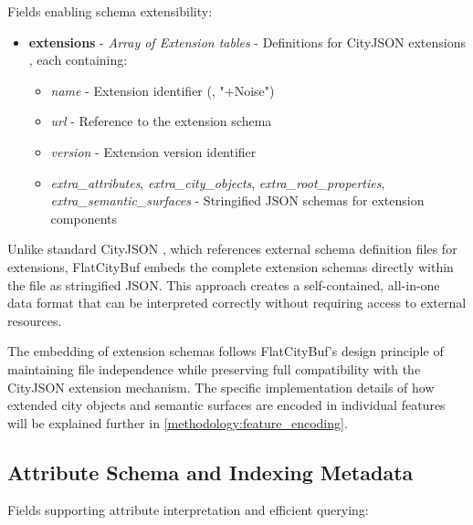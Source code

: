 Fields enabling schema extensibility:

\begin{itemize}
  \item \textbf{extensions} - \textit{Array of Extension tables} - Definitions for CityJSON extensions \citep{cityjson_spec}, each containing:
    \begin{itemize}
      \item \textit{name} - Extension identifier (\eg, "+Noise")
      \item \textit{url} - Reference to the extension schema
      \item \textit{version} - Extension version identifier
      \item \textit{extra\_attributes}, \textit{extra\_city\_objects}, \textit{extra\_root\_properties}, \textit{extra\_semantic\_surfaces} - Stringified JSON schemas for extension components
    \end{itemize}
\end{itemize}

Unlike standard CityJSON \citep{cityjson_spec}, which references external schema definition files for extensions, FlatCityBuf embeds the complete extension schemas directly within the file as stringified JSON. This approach creates a self-contained, all-in-one data format that can be interpreted correctly without requiring access to external resources.

The embedding of extension schemas follows FlatCityBuf's design principle of maintaining file independence while preserving full compatibility with the CityJSON extension mechanism. The specific implementation details of how extended city objects and semantic surfaces are encoded in individual features will be explained further in \autoref{methodology:feature_encoding}.

\subsection{Attribute Schema and Indexing Metadata}
\label{methodology:header:schema_indexing}

Fields supporting attribute interpretation and efficient querying:

